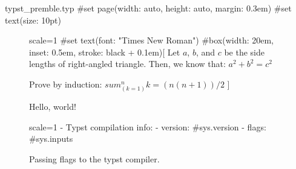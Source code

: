 \documentclass{article}
\begin{document}
\begin{filecontents}[overwrite]{typst_premble.typ}
#set page(width: auto, height: auto, margin: 0.3em)
#set text(size: 10pt)
\end{filecontents}

\begin{figure}[h]
    \centering
    \begin{typst}{scale=1}
    #set text(font: "Times New Roman")
    #box(width: 20em, inset: 0.5em, stroke: black + 0.1em)[
        Let $a$, $b$, and $c$ be the side
        lengths of right-angled triangle.
        Then, we know that:
        $ a^2 + b^2 = c^2 $

        Prove by induction:
        $ sum_(k=1)^n k = (n(n+1)) / 2 $
    ]
    \end{typst}
    \caption{Hello, world!}
\end{figure}

\renewcommand{\typstflags}{--input a=b}
\begin{figure}[h]
    \centering
    \begin{typst}{scale=1}
        - Typst compilation info:
            - version: #sys.version
            - flags: #sys.inputs
    \end{typst}
    \caption{Passing flags to the typst compiler.}
\end{figure}
\end{document}
